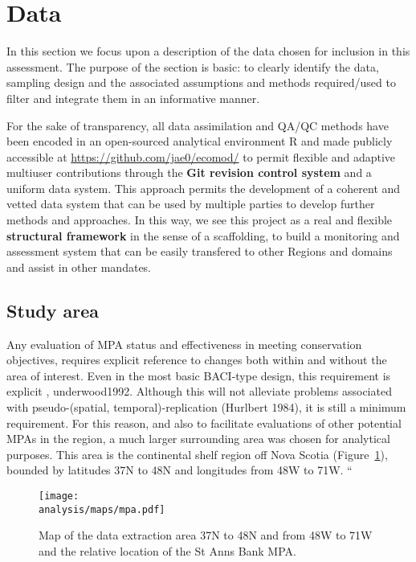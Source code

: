 \documentclass[letterpaper,portrait,11pt]{scrartcl}
\numberwithin{equation}{section}		%
\numberwithin{figure}{section}		%
\numberwithin{table}{section}				%
\newcommand{\ecomod}{\string~/ecomod_data/}   %
\newcommand{\analysis}{\ecomod/mpa/analysis/}   %
\begin{document}
\section{Data} 

In this section we focus upon a description of the data chosen for inclusion in this assessment. The purpose of the section is basic: to clearly identify the data, sampling design and the associated assumptions and methods required/used to filter and integrate them in an informative manner. 

For the sake of transparency, all data assimilation and QA/QC methods have been encoded in an open-sourced analytical environment R \parencite{rCran} and made publicly accessible at \url{https://github.com/jae0/ecomod/} to permit flexible and adaptive multiuser contributions through the \textbf{Git revision control system} and a uniform  data system. This approach permits the development of a coherent and vetted data system that can be used by multiple parties to develop further methods and approaches. In this way, we see this project as a real and flexible \textbf{structural framework} in the sense of a scaffolding, to build a monitoring and assessment system that can be easily transfered to other Regions and domains and assist in other mandates. 


\subsection{Study area}
Any evaluation of MPA status and effectiveness in meeting conservation objectives, requires explicit reference to changes both within and without the area of interest. Even in the most basic BACI-type design, this requirement is explicit \parencite{green:1979}, underwood1992. Although this will not alleviate problems associated with pseudo-(spatial, temporal)-replication (Hurlbert 1984), it is still a minimum requirement. For this reason, and also to facilitate evaluations of other potential MPAs in the region, a much larger surrounding area was chosen for analytical purposes. This area is the continental shelf region off Nova Scotia (Figure~\ref{fig:SAB}), bounded by latitudes 37N to 48N and longitudes from 48W to 71W.  ``

\begin{figure}[h]
  \label{fig:SAB}
  \centering
  \texttt{[image: \\analysis/maps/mpa.pdf]}
  \caption{Map of the data extraction area 37N to 48N and from 48W to 71W and the relative location of the St Anns Bank MPA.}
\end{figure}
\end{document}
